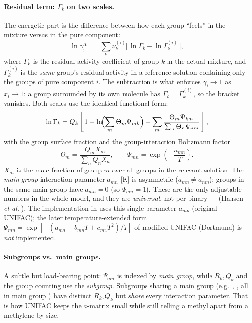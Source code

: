 \documentclass[11pt,a4paper]{article}
\begin{document}
\paragraph{Residual term: $\Gamma_k$ on two scales.} The energetic part
is the difference between how each group ``feels'' in the mixture versus
in the pure component:
\begin{equation}
   \ln \gamma_i^{R}
   \;=\; \sum_k \nu^{(i)}_k
        \bigl[\,\ln \Gamma_k - \ln \Gamma_k^{(i)}\,\bigr],
   \label{eq:unifac-res}
\end{equation}
where $\Gamma_k$ is the residual activity coefficient of group $k$ in the
actual mixture, and $\Gamma_k^{(i)}$ is the \emph{same} group's residual
activity in a reference solution containing only the groups of pure
component $i$. The subtraction is what enforces $\gamma_i \to 1$ as
$x_i \to 1$: a group surrounded by its own molecule has
$\Gamma_k = \Gamma_k^{(i)}$, so the bracket vanishes. Both scales use the
identical functional form:
\begin{equation}
   \ln \Gamma_k = Q_k
   \left[\,1 - \ln\!\Bigl(\sum_m \Theta_m \Psi_{mk}\Bigr)
        - \sum_m \frac{\Theta_m \Psi_{km}}
                       {\sum_n \Theta_n \Psi_{nm}}\,\right],
   \label{eq:unifac-Gamma}
\end{equation}
with the group surface fraction and the group-interaction Boltzmann
factor
\begin{equation}
   \Theta_m = \frac{Q_m X_m}{\sum_n Q_n X_n},
   \qquad
   \Psi_{mn} = \exp\!\left(-\frac{a_{mn}}{T}\right).
   \label{eq:unifac-theta-psi}
\end{equation}
$X_m$ is the mole fraction of group $m$ over all groups in the relevant
solution. The \emph{main-group} interaction parameter $a_{mn}$ [K] is
asymmetric ($a_{mn} \ne a_{nm}$); groups in the same main group have
$a_{mn} = 0$ (so $\Psi_{mn} = 1$). These are the only adjustable numbers
in the whole model, and they are \emph{universal}, not per-binary ---
 (Hansen \emph{et al.}
\cite{Hansen1991}). The implementation in
 uses this
single-parameter $a_{mn}$ (original UNIFAC); the later
temperature-extended form $\Psi_{mn} = \exp[-(a_{mn} + b_{mn}T +
c_{mn}T^2)/T]$ of modified UNIFAC (Dortmund) is \emph{not} implemented.

\paragraph{Subgroups vs.\ main groups.} A subtle but load-bearing point:
$\Psi_{mn}$ is indexed by \emph{main group}, while $R_k, Q_k$ and the
group counting use the \emph{subgroup}. Subgroups sharing a main group
(e.g.\ , ,  all in main group )
have distinct $R_k, Q_k$ but \emph{share} every interaction parameter.
That is how UNIFAC keeps the $a$-matrix small while still telling a
methyl apart from a methylene by size.
\end{document}
